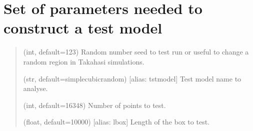 \documentclass[letterpaper,10pt,english]{sphinxmanual}
\begin{document}
\section{Set of parameters needed to construct a test model}
\label{\detokenize{params:set-of-parameters-needed-to-construct-a-test-model}}\begin{quote}\begin{description}
\sphinxAtStartPar
(int, default=123) Random number seed to test run or useful to change a random region in Takahasi simulations.

\sphinxAtStartPar
(str, default=simple\sphinxhyphen{}cubic\sphinxhyphen{}random) {[}alias: tstmodel{]} Test model name to analyse.

\sphinxAtStartPar
(int, default=16348) Number of points to test.

\sphinxAtStartPar
(float, default=10000) {[}alias: lbox{]} Length of the box to test.

\end{description}\end{quote}
\end{document}
